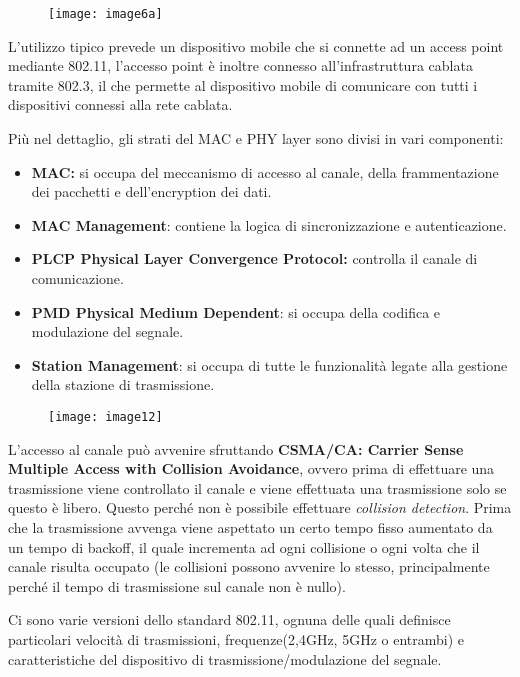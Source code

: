 \begin{figure}[H]
  \centering
  \texttt{[image: image6a]}
\end{figure}

L'utilizzo tipico prevede un dispositivo mobile che si connette ad un
access point mediante 802.11, l'accesso point è inoltre connesso
all'infrastruttura cablata tramite 802.3, il che permette al dispositivo
mobile di comunicare con tutti i dispositivi connessi alla rete cablata.

Più nel dettaglio, gli strati del MAC e PHY layer sono divisi in vari
componenti:

\begin{itemize}
\item
  \textbf{MAC:} si occupa del meccanismo di accesso al canale, della
  frammentazione dei pacchetti e dell'encryption dei dati.
\item
  \textbf{MAC Management}: contiene la logica di sincronizzazione e
  autenticazione.
\item
  \textbf{PLCP Physical Layer Convergence Protocol:} controlla il canale
  di comunicazione.
\item
  \textbf{PMD Physical Medium Dependent}: si occupa della codifica e
  modulazione del segnale.
\item
  \textbf{Station Management}: si occupa di tutte le funzionalità legate
  alla gestione della stazione di trasmissione.
\end{itemize}

\begin{figure}[H]
  \centering
  \texttt{[image: image12]}
\end{figure}

L'accesso al canale può avvenire sfruttando \textbf{CSMA/CA: Carrier Sense
Multiple Access with Collision Avoidance}, ovvero prima di effettuare
una trasmissione viene controllato il canale e viene effettuata una
trasmissione solo se questo è libero. Questo perché non è possibile
effettuare \textit{collision detection}.
Prima che la trasmissione avvenga viene aspettato
un certo tempo fisso aumentato da un tempo di backoff, il quale incrementa ad ogni
collisione o ogni volta che il canale risulta occupato (le collisioni possono
avvenire lo stesso, principalmente perché il tempo di trasmissione sul canale
non è nullo).

Ci sono varie versioni dello standard 802.11, ognuna delle quali definisce
particolari velocità di trasmissioni, frequenze(2,4GHz, 5GHz o entrambi) e
caratteristiche del dispositivo di trasmissione/modulazione del segnale.

